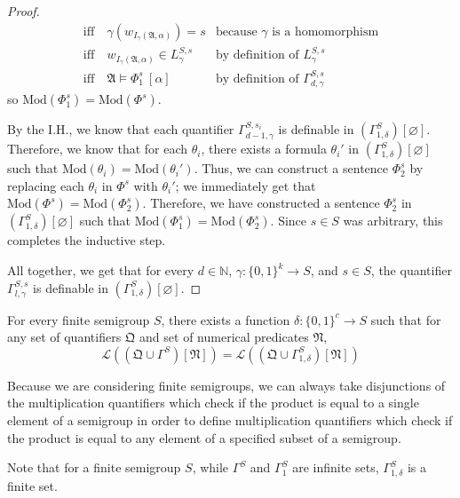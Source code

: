 \documentclass[a4paper,UKenglish,cleveref, autoref, thm-restate, anonymous]{lipics-v2021}
\newcommand{\todo}[1]{\textit{\textcolor{red}{[TODO]: #1}}}
\begin{document}
\begin{proof}
\begin{align*}
        \text{iff}\ &\gamma(w_{I_\gamma(\mathfrak{A},\alpha)}) = s &\text{because $\gamma$ is a homomorphism}\\
        \text{iff}\ &w_{I_\gamma(\mathfrak{A},\alpha)} \in L^{S,s}_\gamma &\text{by definition of $L^{S,s}_\gamma$}\\
        \text{iff}\ &\mathfrak{A} \models \Phi^s_1\ [\alpha]&\text{by definition of $\Gamma^{S,s}_{d,\gamma}$}
    \end{align*}
    so $\text{Mod}(\Phi^s_1) = \text{Mod}(\Phi^s)$.

    By the I.H., we know that each quantifier $\Gamma^{S,s_i}_{d-1,\gamma}$ is definable in $(\Gamma^S_{1,\delta})[\varnothing]$. Therefore, we know that for each $\theta_i$, there exists a formula $\theta_i'$ in $(\Gamma^S_{1,\delta})[\varnothing]$ such that $\text{Mod}(\theta_i) = \text{Mod}(\theta_i')$. Thus, we can construct a sentence $\Phi_2^s$ by replacing each $\theta_i$ in $\Phi^s$ with $\theta_i'$; we immediately get that $\text{Mod}(\Phi^s) = \text{Mod}(\Phi_2^s)$. Therefore, we have constructed a sentence $\Phi_2^s$ in $(\Gamma^S_{1,\delta})[\varnothing]$ such that $\text{Mod}(\Phi_1^s) = \text{Mod}(\Phi_2^s)$. Since $s \in S$ was arbitrary, this completes the inductive step.

    All together, we get that for every $d \in \mathbb{N}$, $\gamma : \{0,1\}^k \rightarrow S$, and $s \in S$, the quantifier $\Gamma^{S,s}_{l,\gamma}$ is definable in $(\Gamma^{S}_{1,\delta})[\varnothing]$.


\end{proof}

\begin{corollary}\label{cor:unarymqssuffice}
    For every finite semigroup $S$, there exists a function $\delta : \{0,1\}^c \rightarrow S$ such that for any set of quantifiers $\mathfrak{Q}$ and set of numerical predicates $\mathfrak{N}$,\[
        \mathcal{L}((\mathfrak{Q} \cup \Gamma^{S})[\mathfrak{N}]) = \mathcal{L}((\mathfrak{Q} \cup \Gamma^{S}_{1,\delta})[\mathfrak{N}])
    \]
\end{corollary}
\begin{remark}
    Because we are considering finite semigroups, we can always take disjunctions of the multiplication quantifiers which check if the product is equal to a single element of a semigroup in order to define multiplication quantifiers which check if the product is equal to any element of a specified subset of a semigroup.
\end{remark}
\begin{remark}
    Note that for a finite semigroup $S$, while $\Gamma^{S}$ and $\Gamma^{S}_1$ are infinite sets, $\Gamma^{S}_{1,\delta}$ is a finite set.
\end{remark}
\end{document}
